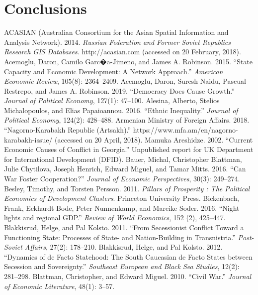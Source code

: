 \documentclass[12pt,a4paper]{article}%
\begin{document}
\section{Conclusions}

\begin{thebibliography}{99}
\bibitem{} ACASIAN (Australian Consortium for the Asian Spatial Information and Analysis Network). 2014. \textit{Russian Federation and Former Soviet Republics Research GIS Databases}. http://acasian.com (accessed on 20 February, 2018).
\bibitem{} Acemoglu, Daron, Camilo Garc�a-Jimeno, and James A. Robinson. 2015. ``State Capacity and Economic Development: A Network Approach.'' \textit{American Economic Review}, 105(8): 2364--2409.
\bibitem{} Acemoglu, Daron, Suresh Naidu, Pascual Restrepo, and James A. Robinson. 2019. ``Democracy Does Cause Growth.'' \textit{Journal of Political Economy}, 127(1): 47--100.
\bibitem{} Alesina, Alberto, Stelios Michalopoulos, and Elias Papaioannou. 2016. ``Ethnic Inequality.'' \textit{Journal of Political Economy}, 124(2): 428--488.
\bibitem{} Armenian Ministry of Foreign Affairs. 2018. ``Nagorno-Karabakh Republic (Artsakh).'' https://www.mfa.am/en/nagorno-karabakh-issue/ (accessed on 20 April, 2018).
\bibitem{} Mamuka Areshidze. 2002. ``Current Economic Causes of Conflict in Georgia.'' Unpublished report for UK Department for International Development (DFID).
\bibitem{} Bauer, Michal, Christopher Blattman, Julie Chytilova, Joseph Henrich, Edward Miguel, and Tamar Mitts. 2016. ``Can War Foster Cooperation?'' \textit{Journal of Economic Perspectives}, 30(3): 249--274.
\bibitem{} Besley, Timothy, and Torsten Persson. 2011. \textit{Pillars of Prosperity : The Political Economics of Development Clusters}. Princeton University Press.
\bibitem{} Bickenbach, Frank, Eckhardt Bode, Peter Nunnenkamp, and Mareike Soder. 2016. ``Night lights and regional GDP.'' \textit{Review of World Economics}, 152 (2), 425--447.
\bibitem{} Blakkisrud, Helge, and Pal Kolsto. 2011. ``From Secessionist Conflict Toward a Functioning State: Processes of State- and Nation-Building in Transnistria.'' \textit{Post-Soviet Affairs}, 27(2): 178--210.
\bibitem{} Blakkisrud, Helge, and Pal Kolsto. 2012. ``Dynamics of de Facto Statehood: The South Caucasian de Facto States between Secession and Sovereignty.'' \textit{Southeast European and Black Sea Studies}, 12(2): 281--298.
\bibitem{} Blattman, Christopher, and Edward Miguel. 2010. ``Civil War.'' \textit{Journal of Economic Literature}, 48(1): 3--57.      

\end{thebibliography}
\end{document}
